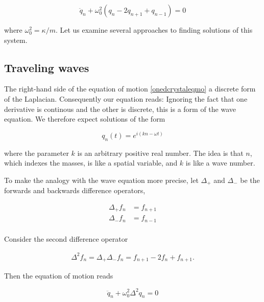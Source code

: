 \begin{equation}
\label{onedcrystaleqmo}
\ddot q_n + \omega_0^2(q_n - 2q_{n+1}+ q_{n-1}) = 0
\end{equation}

where $\omega_0^2 = \kappa/m$.
Let us examine several approaches to finding solutions of this system.





\subsection{Traveling waves}

The right-hand side of the equation of motion \eqref{onedcrystaleqmo} a discrete form of the Laplacian.  Consequently our equation reads:  Ignoring the fact that one derivative is continous and the other is discrete, this is a form of the wave equation.  We therefore expect solutions of the form

\begin{equation}
\label{crystaltravelingwaves}
q_n(t) = e^{i(kn - \omega t)}
\end{equation}

where the parameter $k$ is an arbitrary positive real number.
The idea is that $n$, which indexes the masses, is like a spatial variable, and $k$ is like a wave number.

To make the analogy with the wave equation more precise, let $\Delta_+$ and $\Delta_-$ be the forwards  and backwards difference operators,

\begin{align}
  \Delta_+ f_n & = f_{n+1} \\
  \Delta_- f_n & = f_{n-1} \\
\end{align}

Consider the second difference operator

\begin{align}
  \Delta^2 f_n = \Delta_+\Delta_- f_n  = f_{n+1}  - 2f_n + f_{n+1}.
\end{align}

Then the equation of motion reads

\begin{equation}
\label{onedcrystaleqmolaplacian}
\ddot q_n + \omega_0^2 \Delta^2 q_n = 0
\end{equation}


